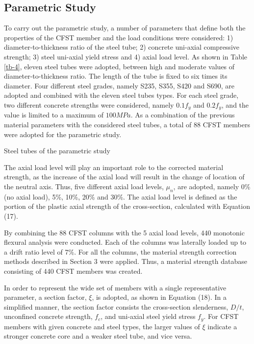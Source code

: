 \documentclass[12pt,a4]{article}
\begin{document}
	\subsection{Parametric Study}
	To carry out the parametric study, a number of parameters that define both the properties of the CFST member and the load conditions were considered: 1) diameter-to-thickness ratio of the steel tube; 2) concrete uni-axial compressive strength; 3) steel uni-axial yield stress and 4) axial load level. As shown in Table \ref{tb-4}, eleven steel tubes were adopted, between high and moderate values of diameter-to-thickness ratio. The length of the tube is fixed to six times its diameter. Four different steel grades, namely S235, S355, S420 and S690, are adopted and combined with the eleven steel tubes types. For each steel grade, two different concrete strengths were considered, namely $0.1f_y$ and $0.2f_y$, and the value is limited to a maximum of $100MPa$. As a combination of the previous material parameters with the considered steel tubes, a total of 88 CFST members were adopted for the parametric study.
	\par
	\begin{table}
		\caption{Steel tubes of the parametric study}
		\label{tb-4}
	\end{table}
	\par
	The axial load level will play an important role to the corrected material strength, as the increase of the axial load will result in the change of location of the neutral axis. Thus, five different axial load levels, $μ_n$, are adopted, namely 0\% (no axial load), 5\%, 10\%, 20\% and 30\%. The axial load level is defined as the portion of the plastic axial strength of the cross-section, calculated with Equation (17).
	\par
	By combining the 88 CFST columns with the 5 axial load levels, 440 monotonic flexural analysis were conducted. Each of the columns was laterally loaded up to a drift ratio level of 7\%. For all the columns, the material strength correction methods described in Section 3 were applied. Thus, a material strength database consisting of 440 CFST members was created.
	\par
	In order to represent the wide set of members with a single representative parameter, a section factor, $ξ$, is adopted, as shown in Equation (18). In a simplified manner, the section factor consists the cross-section slenderness, $D/t$, unconfined concrete strength, $f_c$, and uni-axial steel yield stress $f_y$. For CFST members with given concrete and steel types, the larger values of $ξ$ indicate a stronger concrete core and a weaker steel tube, and vice versa.
\end{document}
